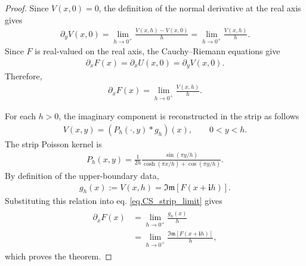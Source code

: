 \documentclass[11pt]{article}
\newcommand{\imag}{\textbf{i}}
\newcommand{\ImagPart}{\mathfrak{Im}}
\begin{document}
\begin{proof}
	Since \(V(x,0)=0\), the definition of the normal derivative at the
	real axis gives
	\begin{align*}
		\partial_yV(x,0)
		=
		\lim_{h\to0^+}
		\frac{V(x,h)-V(x,0)}{h}
		=
		\lim_{h\to0^+}
		\frac{V(x,h)}{h}.
	\end{align*}
	Since \(F\) is real-valued on the real axis, the Cauchy--Riemann
	equations give
	\begin{align*}
		\partial_xF(x)
		=
		\partial_xU(x,0)
		=
		\partial_yV(x,0).
	\end{align*}
	Therefore,
	\begin{align*}
		\partial_xF(x)
		=
		\lim_{h\to0^+}
		\frac{V(x,h)}{h}.
	\end{align*}
	
	For each \(h>0\), the imaginary component is reconstructed in the
	strip as follows  \citep{widder1961functions}
	\begin{align*}
		V(x,y)
		=
		\left(P_h(\cdot,y)*g_h\right)(x),
		\qquad 0<y<h.
	\end{align*}
	The strip
	Poisson kernel is \citep{widder1961functions}
	\begin{align}
	P_h(x,y)
	=
	\frac{1}{2h}
	\frac{\sin(\pi y/h)}
	{\cosh(\pi x/h)+\cos(\pi y/h)} .
\end{align}
By definition of the upper-boundary data,
	\begin{align}
		g_h(x)
		:=
		V(x,h)
		=
		\ImagPart\!\left[F(x+\imag h)\right].
	\end{align}
	Substituting this relation into
	eq. \eqref{eq.CS_strip_limit} gives
	\begin{align}
\begin{aligned}
			\partial_xF(x)
	&=
	\lim_{h\to0^+}
	\frac{g_h(x)}{h}
	\\
	&=
	\lim_{h\to0^+}
	\frac{\ImagPart\!\left[F(x+\imag h)\right]}{h},
\end{aligned}
	\end{align}
	which proves the theorem.
\end{proof}
\end{document}
